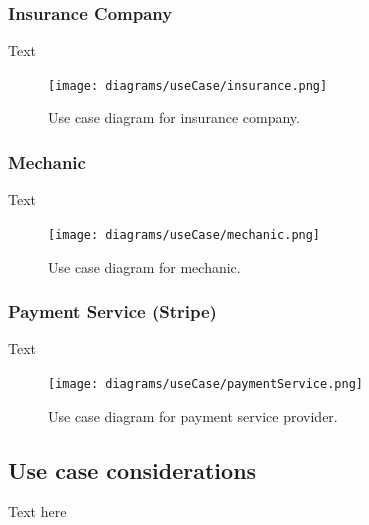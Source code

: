     \subsubsection{Insurance Company}
      Text
      \begin{figure}[H]
        \centering
        \texttt{[image: diagrams/useCase/insurance.png]}
        \caption{Use case diagram for insurance company.}
        \label{fig:UCinsurance}
      \end{figure}
      
    \subsubsection{Mechanic}
      Text
      \begin{figure}[H]
        \centering
        \texttt{[image: diagrams/useCase/mechanic.png]}
        \caption{Use case diagram for mechanic.}
        \label{fig:UCmechanic}
      \end{figure}

    \subsubsection{Payment Service (Stripe)}
      Text
      \begin{figure}[H]
        \centering
        \texttt{[image: diagrams/useCase/paymentService.png]}
        \caption{Use case diagram for payment service provider.}
        \label{fig:UCpayment}
      \end{figure}
  
  \subsection{Use case considerations}
      Text here
\newpage